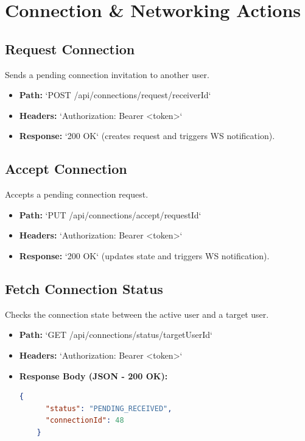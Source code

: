 \section{Connection \& Networking Actions}

\subsection{Request Connection}
Sends a pending connection invitation to another user.
\begin{itemize}
    \item \textbf{Path:} `POST /api/connections/request/{receiverId}`
    \item \textbf{Headers:} `Authorization: Bearer <token>`
    \item \textbf{Response:} `200 OK` (creates request and triggers WS notification).
\end{itemize}

\subsection{Accept Connection}
Accepts a pending connection request.
\begin{itemize}
    \item \textbf{Path:} `PUT /api/connections/accept/{requestId}`
    \item \textbf{Headers:} `Authorization: Bearer <token>`
    \item \textbf{Response:} `200 OK` (updates state and triggers WS notification).
\end{itemize}

\subsection{Fetch Connection Status}
Checks the connection state between the active user and a target user.
\begin{itemize}
    \item \textbf{Path:} `GET /api/connections/status/{targetUserId}`
    \item \textbf{Headers:} `Authorization: Bearer <token>`
    \item \textbf{Response Body (JSON - 200 OK):}
    \begin{lstlisting}[language=json]
    {
      "status": "PENDING_RECEIVED",
      "connectionId": 48
    }
    \end{lstlisting}
\end{itemize}

